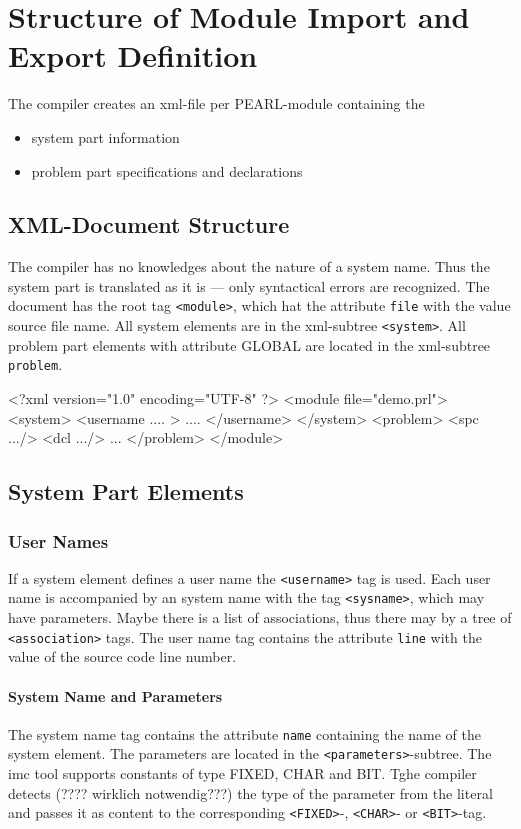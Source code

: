 \chapter{Structure of Module Import and Export Definition}

The compiler creates an xml-file per PEARL-module containing the
\begin{itemize}
\item system part information
\item problem part specifications and declarations
\end{itemize}

\section{XML-Document Structure}
The compiler has no knowledges about the nature of a system name.
Thus the system part is translated as it is --- only syntactical errors
are recognized. 
The document has the root tag \verb|<module>|, which hat the attribute
\verb|file| with the value source file name.  
All system elements are in the xml-subtree \verb|<system>|.
All problem part elements with attribute GLOBAL are located
in the xml-subtree \verb|problem|.

\begin{XMLCode}
<?xml version="1.0" encoding="UTF-8" ?>
<module file="demo.prl">
<system>
   <username .... >
   ....
   </username>
</system>
<problem>
  <spc .../>
  <dcl .../>
  ...
</problem>
</module>
\end{XMLCode}

\section{System Part Elements}
\subsection{User Names}
If a system element defines a user name the \verb|<username>| tag is 
used. Each user name is accompanied by an system name with the tag 
\verb|<sysname>|, which may have parameters.
Maybe there is a list of associations, thus there may by a tree
of \verb|<association>| tags.
The user name tag contains the attribute \verb|line| with the value of the 
source code line number.

\subsubsection{System Name and Parameters}
\label{sec_system_names}
The system name tag contains the attribute \verb|name| containing the 
name of the system element.
The parameters are located in the \verb|<parameters>|-subtree.
The imc tool supports constants of type FIXED, CHAR and BIT.
Tghe compiler detects (???? wirklich notwendig???) the type of the parameter
from the literal and passes it as content to the corresponding
\verb|<FIXED>|-, \verb|<CHAR>|- or \verb|<BIT>|-tag.

